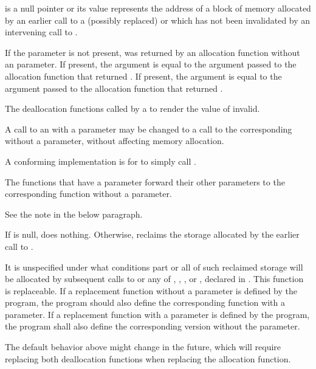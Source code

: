 \begin{itemdescr}
\pnum
\expects
{} is a null pointer or
its value represents the address of
a block of memory allocated by
an earlier call to a (possibly replaced)
or
which has not been invalidated by an intervening call to
.

\pnum
If the  parameter is not present,
 was returned by an allocation function
without an  parameter.
If present, the  argument
is equal to the  argument
passed to the allocation function that returned .
If present, the  argument
is equal to the  argument
passed to the allocation function that returned .

\pnum
\effects
The
deallocation functions
called by a
to render the value of  invalid.

\pnum
\required
A call to an 
with a  parameter
may be changed to
a call to the corresponding 
without a  parameter,
without affecting memory allocation.
\begin{note}
A conforming implementation is for
 to simply call
.
\end{note}

\pnum
{}
The functions that have a  parameter
forward their other parameters
to the corresponding function without a  parameter.
\begin{note}
See the note in the below \remarks paragraph.
\end{note}

\pnum
{}
If  is null, does nothing. Otherwise, reclaims the
storage allocated by the earlier call to .

\pnum
\remarks
It is unspecified under what conditions part or all of such
%
reclaimed storage will be allocated by subsequent
calls to
or any of
,
,
,
or
,
declared in .
This function is replaceable.
If a replacement function
without a  parameter
is defined by the program,
the program should also define the corresponding
function with a  parameter.
If a replacement function
with a  parameter
is defined by the program,
the program shall also define the corresponding
version without the  parameter.
\begin{note}
The default behavior above might change in the future,
which will require replacing both deallocation functions
when replacing the allocation function.
\end{note}
\end{itemdescr}

